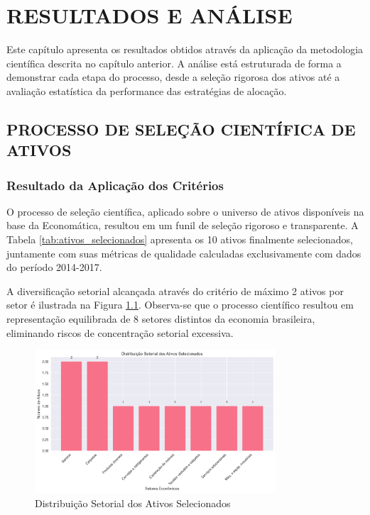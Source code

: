 
\chapter{RESULTADOS E ANÁLISE}

Este capítulo apresenta os resultados obtidos através da aplicação da metodologia científica descrita no capítulo anterior. A análise está estruturada de forma a demonstrar cada etapa do processo, desde a seleção rigorosa dos ativos até a avaliação estatística da performance das estratégias de alocação.

\section{PROCESSO DE SELEÇÃO CIENTÍFICA DE ATIVOS}

\subsection{Resultado da Aplicação dos Critérios}

O processo de seleção científica, aplicado sobre o universo de ativos disponíveis na base da Economática, resultou em um funil de seleção rigoroso e transparente. A Tabela \ref{tab:ativos_selecionados} apresenta os 10 ativos finalmente selecionados, juntamente com suas métricas de qualidade calculadas exclusivamente com dados do período 2014-2017.

% 

A diversificação setorial alcançada através do critério de máximo 2 ativos por setor é ilustrada na Figura \ref{fig:distribuicao_setorial}. Observa-se que o processo científico resultou em representação equilibrada de 8 setores distintos da economia brasileira, eliminando riscos de concentração setorial excessiva.

\begin{figure}[htbp]
\centering
\includegraphics[width=0.8\textwidth]{../results/figures/distribuicao_setorial.png}
\caption{Distribuição Setorial dos Ativos Selecionados}
\label{fig:distribuicao_setorial}
\end{figure}


